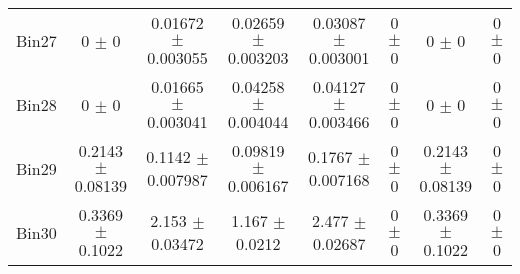 \begin{tabular}{@{\extracolsep{4pt}}lccccccc@{}}
     Bin27 & 0 $\pm$ 0 & 0.01672 $\pm$ 0.003055 & 0.02659 $\pm$ 0.003203 & 0.03087 $\pm$ 0.003001 & 0 $\pm$ 0 & 0 $\pm$ 0 & 0 $\pm$ 0 \\ 
     Bin28 & 0 $\pm$ 0 & 0.01665 $\pm$ 0.003041 & 0.04258 $\pm$ 0.004044 & 0.04127 $\pm$ 0.003466 & 0 $\pm$ 0 & 0 $\pm$ 0 & 0 $\pm$ 0 \\ 
     Bin29 & 0.2143 $\pm$ 0.08139 & 0.1142 $\pm$ 0.007987 & 0.09819 $\pm$ 0.006167 & 0.1767 $\pm$ 0.007168 & 0 $\pm$ 0 & 0.2143 $\pm$ 0.08139 & 0 $\pm$ 0 \\ 
     Bin30 & 0.3369 $\pm$ 0.1022 & 2.153 $\pm$ 0.03472 & 1.167 $\pm$ 0.0212 & 2.477 $\pm$ 0.02687 & 0 $\pm$ 0 & 0.3369 $\pm$ 0.1022 & 0 $\pm$ 0 \\ 
\hline\hline
  \end{tabular}
